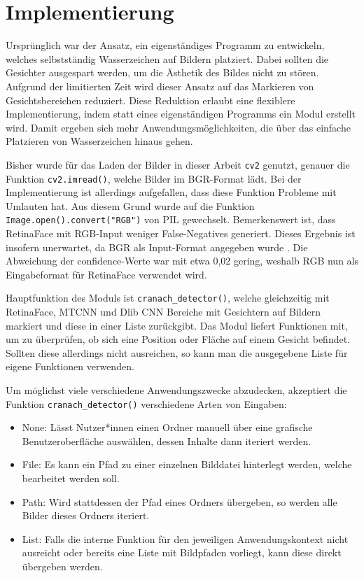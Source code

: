 \chapter{Implementierung}
%
Ursprünglich war der Ansatz, ein eigenständiges Programm zu entwickeln, welches selbstständig Wasserzeichen auf Bildern platziert. Dabei sollten die Gesichter ausgespart werden, um die Ästhetik des Bildes nicht zu stören. Aufgrund der limitierten Zeit wird dieser Ansatz auf das Markieren von Gesichtsbereichen reduziert. Diese Reduktion erlaubt eine flexiblere Implementierung, indem statt eines eigenständigen Programms ein Modul erstellt wird. Damit ergeben sich mehr Anwendungsmöglichkeiten, die über das einfache Platzieren von Wasserzeichen hinaus gehen.

Bisher wurde für das Laden der Bilder in dieser Arbeit \texttt{cv2} genutzt, genauer die Funktion \texttt{cv2.imread()}, welche Bilder im BGR-Format lädt. Bei der Implementierung ist allerdings aufgefallen, dass diese Funktion Probleme mit Umlauten hat. Aus diesem Grund wurde auf die Funktion \texttt{Image.open().convert("RGB")} von PIL gewechselt. Bemerkenswert ist, dass RetinaFace mit RGB-Input weniger False-Negatives generiert. Dieses Ergebnis ist insofern unerwartet, da BGR als Input-Format angegeben wurde \parencite{lizardNttstar25}. Die Abweichung der \gls{confidence}-Werte war mit etwa 0{,}02 gering, weshalb RGB nun als Eingabeformat für RetinaFace verwendet wird.

Hauptfunktion des Moduls ist \texttt{cranach\_detector()}, welche gleichzeitig mit RetinaFace, MTCNN und Dlib CNN Bereiche mit Gesichtern auf Bildern markiert und diese in einer Liste zurückgibt. Das Modul liefert Funktionen mit, um zu überprüfen, ob sich eine Position oder Fläche auf einem Gesicht befindet. Sollten diese allerdings nicht ausreichen, so kann man die ausgegebene Liste für eigene Funktionen verwenden.

Um möglichst viele verschiedene Anwendungszwecke abzudecken, akzeptiert die Funktion \texttt{cranach\_detector()} verschiedene Arten von Eingaben:
\begin{itemize}
  \item None: Lässt Nutzer*innen einen Ordner manuell über eine grafische Benutzeroberfläche auswählen, dessen Inhalte dann iteriert werden.
  \item File: Es kann ein Pfad zu einer einzelnen Bilddatei hinterlegt werden, welche bearbeitet werden soll.
  \item Path: Wird stattdessen der Pfad eines Ordners übergeben, so werden alle Bilder dieses Ordners iteriert.
  \item List: Falls die interne Funktion für den jeweiligen Anwendungskontext nicht ausreicht oder bereits eine Liste mit Bildpfaden vorliegt, kann diese direkt übergeben werden.
\end{itemize}

